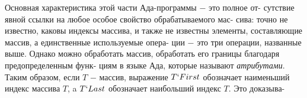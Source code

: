 \documentclass{./git_rep/mai_prac_2017/template/mai_book}
\begin{document}
Основная характеристика этой части Ада-программы $-$ это полное от-\linebreak
сутствие явной ссылки на любое особое свойство обрабатываемого мас-\linebreak
сива: точно не известно, каковы индексы массива, и также не известны\linebreak
элементы, составляющие массив, а единственные используемые опера-\linebreak
ции $-$ это три операции, названные выше. Однако можно обработать\linebreak
массив, обработать его границы благодаря предопределенным функ-\linebreak
циям в языке Ада, которые называют \textit{атрибутами}. Таким образом,\linebreak
если $T$ $-$ массив, выражение $T`First$ обозначает наименьший  индекс\linebreak
массива $T$, a $T`Last$ обозначает наибольший индекс $T$. Это доказыва-\linebreak
\newpage
\end{document}
